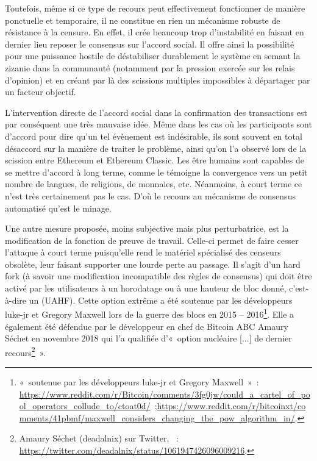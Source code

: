 Toutefois, même si ce type de recours peut effectivement fonctionner de manière ponctuelle et temporaire, il ne constitue en rien un mécanisme robuste de résistance à la censure. En effet, il crée beaucoup trop d'instabilité en faisant en dernier lieu reposer le consensus sur l'accord social. Il offre ainsi la possibilité pour une puissance hostile de déstabiliser durablement le système en semant la zizanie dans la communauté (notamment par la pression exercée sur les relais d'opinion) et en créant par là des scissions multiples impossibles à départager par un facteur objectif.

\clearpage
L'intervention directe de l'accord social dans la confirmation des transactions est par conséquent une très mauvaise idée. Même dans les cas où les participants sont d'accord pour dire qu'un tel évènement est indésirable, ils sont souvent en total désaccord sur la manière de traiter le problème, ainsi qu'on l'a observé lors de la scission entre Ethereum et Ethereum Classic. Les être humains sont capables de se mettre d'accord à long terme, comme le témoigne la convergence vers un petit nombre de langues, de religions, de monnaies, etc. Néanmoins, à court terme ce n'est très certainement pas le cas. D'où le recours au mécanisme de consensus automatisé qu'est le minage.


Une autre mesure proposée, moins subjective mais plus perturbatrice, est la modification de la fonction de preuve de travail. Celle-ci permet de faire cesser l'attaque à court terme puisqu'elle rend le matériel spécialisé des censeurs obsolète, leur faisant supporter une lourde perte au passage. Il s'agit d'un hard fork (à savoir une modification incompatible des règles de consensus) qui doit être activé par les utilisateurs à un horodatage ou à une hauteur de bloc donné, c'est-à-dire un  (UAHF). Cette option extrême a été soutenue par les développeurs luke-jr et Gregory Maxwell lors de la guerre des blocs en 2015 -- 2016\footnote{«~soutenue par les développeurs luke-jr et Gregory Maxwell~»~: \url{https://www.reddit.com/r/Bitcoin/comments/3fg0jw/could_a_cartel_of_pool_operators_collude_to/ctoat0d/}~;\url{https://www.reddit.com/r/bitcoinxt/comments/41pbmf/maxwell_considers_changing_the_pow_algorithm_in/}.}. Elle a également été défendue par le développeur en chef de Bitcoin ABC Amaury Séchet en novembre 2018 qui l'a qualifiée d'«~option nucléaire [...] de dernier recours\footnote{Amaury Séchet (deadalnix) sur Twitter, ~: \url{https://twitter.com/deadalnix/status/1061947426096009216}.}~».

